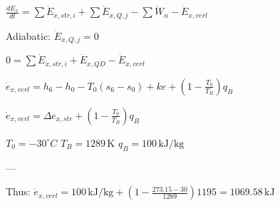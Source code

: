 \( \frac{dE_x}{dt} = \sum \dot{E}_{x,str,i} + \sum \dot{E}_{x,Q,j} - \sum \dot{W}_n - \dot{E}_{x,verl} \)  

Adiabatic: \( \dot{E}_{x,Q,j} = 0 \)  

\( 0 = \sum \dot{E}_{x,str,i} + \dot{E}_{x,QD} - \dot{E}_{x,verl} \)  

\( \dot{e}_{x,verl} = h_6 - h_0 - T_0(s_6 - s_0) + ke + \left(1 - \frac{T_0}{T_B}\right) q_B \)  

\( \dot{e}_{x,verl} = \Delta e_{x,str} + \left(1 - \frac{T_0}{T_B}\right) q_B \)  

\( T_0 = -30^\circ C \)  
\( T_B = 1289 \, \text{K} \)  
\( q_B = 100 \, \text{kJ/kg} \)  

---

Thus:  
\( \dot{e}_{x,verl} = 100 \, \text{kJ/kg} + \left(1 - \frac{273.15 - 30}{1289}\right) 1195 = 1069.58 \, \text{kJ} \)